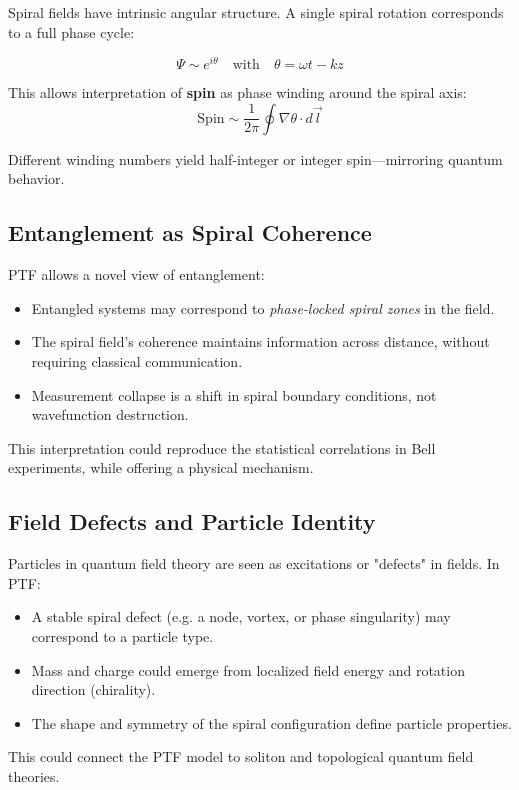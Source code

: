 \documentclass[a4paper,12pt]{article}
\begin{document}
Spiral fields have intrinsic angular structure. A single spiral rotation corresponds to a full phase cycle:

\[
\Psi \sim e^{i\theta} \quad \text{with} \quad \theta = \omega t - kz
\]

This allows interpretation of \textbf{spin} as phase winding around the spiral axis:
\[
\text{Spin} \sim \frac{1}{2\pi} \oint \nabla \theta \cdot d\vec{l}
\]

Different winding numbers yield half-integer or integer spin—mirroring quantum behavior.

\subsection{Entanglement as Spiral Coherence}

PTF allows a novel view of entanglement:

\begin{itemize}
    \item Entangled systems may correspond to \textit{phase-locked spiral zones} in the field.
    \item The spiral field’s coherence maintains information across distance, without requiring classical communication.
    \item Measurement collapse is a shift in spiral boundary conditions, not wavefunction destruction.
\end{itemize}

This interpretation could reproduce the statistical correlations in Bell experiments, while offering a physical mechanism.

\subsection{Field Defects and Particle Identity}

Particles in quantum field theory are seen as excitations or "defects" in fields.  
In PTF:
\begin{itemize}
    \item A stable spiral defect (e.g. a node, vortex, or phase singularity) may correspond to a particle type.
    \item Mass and charge could emerge from localized field energy and rotation direction (chirality).
    \item The shape and symmetry of the spiral configuration define particle properties.
\end{itemize}

This could connect the PTF model to soliton and topological quantum field theories.
\end{document}
